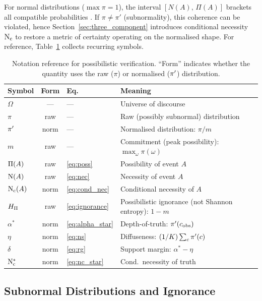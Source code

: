 For normal distributions ($\max\pi=1$), the interval
$[N(A),\, \Pi(A)]$ brackets all compatible probabilities
\citep{Dubois1988-nh,Dubois2007-dd}.
If $\pi \neq \pi'$ (subnormality),
this coherence can be violated,
hence Section~\ref{sec:three_component}
introduces conditional necessity $\mathrm{N}_{\mathrm{c}}$ to restore
a metric of certainty operating on the
normalised shape.
For reference,
Table~\ref{tab:notation} collects recurring
symbols.

\begin{table}[htbp]
\centering
\caption{Notation reference for possibilistic verification. ``Form''
    indicates whether the quantity uses the raw ($\pi$) or normalised
    ($\pi'$) distribution.}
\label{tab:notation}
\small
\begin{tabularx}{\columnwidth}{lclX}
\toprule
Symbol & Form & Eq. & Meaning \\
\midrule
$\Omega$ & --- & --- & Universe of discourse \\
$\pi$ & raw & --- & Raw (possibly subnormal) distribution \\
$\pi'$ & norm & --- & Normalised distribution: $\pi / m$ \\
$m$ & raw & --- & Commitment (peak possibility): $\max_{\omega} \pi(\omega)$ \\
$\Pi(A)$ & raw & \ref{eq:poss} & Possibility of event $A$ \\
$\mathrm{N}(A)$ & raw & \ref{eq:nec} & Necessity of event $A$ \\
$\mathrm{N}_{\mathrm{c}}(A)$ & norm & \ref{eq:cond_nec} & Conditional necessity of $A$ \\
$H_{\Pi}$ & raw & \ref{eq:ignorance} & Possibilistic ignorance (not Shannon entropy): $1 - m$ \\
$\alpha^*$ & norm & \ref{eq:alpha_star} & Depth-of-truth: $\pi'(c_{\mathrm{obs}})$ \\
$\eta$ & norm & \ref{eq:ns} & Diffuseness: $(1/K)\sum_c \pi'(c)$ \\
$\delta$ & norm & \ref{eq:rg} & Support margin: $\alpha^* - \eta$ \\
$\mathrm{N}_{\mathrm{c}}^*$ & norm & \ref{eq:nc_star} & Cond.\ necessity of truth \\
\bottomrule
\end{tabularx}
\end{table}

\subsection{Subnormal Distributions and Ignorance}\label{sec:subnormal}


